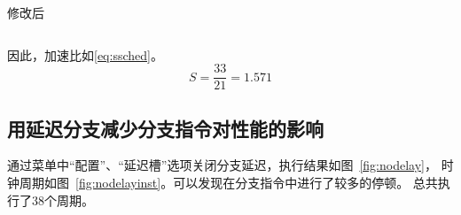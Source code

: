 \documentclass[a4paper,twoside]{article}
\begin{document}
\begin{spacing}{1.2}
\begin{listing}[htb]
	\caption{修改后}
	\label{code:aftersched}
	\inputminted{nasm}{../code/after_schedule.s}
\end{listing}

因此，加速比如\eqref{eq:ssched}。
\begin{equation}
	\label{eq:ssched}
	S=\frac{33}{21} = 1.571
\end{equation}

\clearpage

\subsection{用延迟分支减少分支指令对性能的影响}

通过菜单中“配置”、“延迟槽”选项关闭分支延迟，执行结果如图~\ref{fig:nodelay}，
时钟周期如图~\ref{fig:nodelayinst}。可以发现在分支指令中进行了较多的停顿。
总共执行了38个周期。


\end{spacing}
\end{document}
